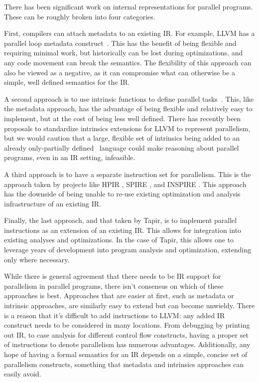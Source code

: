 \documentclass[sigconf]{acmart}
\begin{document}
There has been significant work on internal representations for parallel
programs. These can be roughly broken into four categories. 

First, compilers can attach metadata to an existing IR. For example, LLVM has a
parallel loop metadata construct~\cite{llvmref}. This has the benefit of being
flexible and requiring minimal work, but historically can be lost during
optimizations, and any code movement can break the semantics. The flexibility
of this approach can also be viewed as a negative, as it can compromise
what can otherwise be a simple, well defined semantics for the IR. 

A second approach is to use intrinsic functions to define parallel tasks~\cite{ares}.
This, like the metadata approach, has the advantage of being
flexible and relatively easy to implement, but at the cost of being less well
defined. There has recently been proposals to standardize intrinsics extensions
for LLVM to represent parallelism, but we would caution that a large, flexible
set of intrinsics being added to an already only-partially defined~\cite{verillvm} language could make reasoning about parallel programs, even
in an IR setting, infeasible. 

A third approach is to have a separate instruction set for parallelism. This is
the approach taken by projects like HPIR \cite{zhao2011intermediate}, SPIRE
\cite{khaldi2012spire}, and INSPIRE \cite{jordan2013inspire}. This approach has
the downside of being unable to re-use existing optimization and analysis
infrastructure of an existing IR. 

Finally, the last approach, and that taken by Tapir, is to implement parallel 
instructions as an extension of an existing IR. This allows for integration
into existing analyses and optimizations. In the case of Tapir, this allows one
to leverage years of development into program analysis and optimization,
extending only where necessary. 

While there is general agreement that there needs to be IR support for
parallelism in parallel programs, there isn't consensus on which of these
approaches is best. Approaches that are easier at first, such as metadata
or intrinsic approaches, are similarly easy to extend but can become unwieldy. There is
a reason that it's difficult to add instructions to LLVM: any added IR
construct needs to be considered in many locations. From debugging by printing
out IR, to case analysis for different control flow constructs, having 
a proper set of instructions to denote parallelism has numerous advantages. 
Additionally, any hope of having a formal semantics for an IR depends on a 
simple, concise set of parallelism constructs, something that metadata and
intrinsics approaches can easily avoid. 
\end{document}
